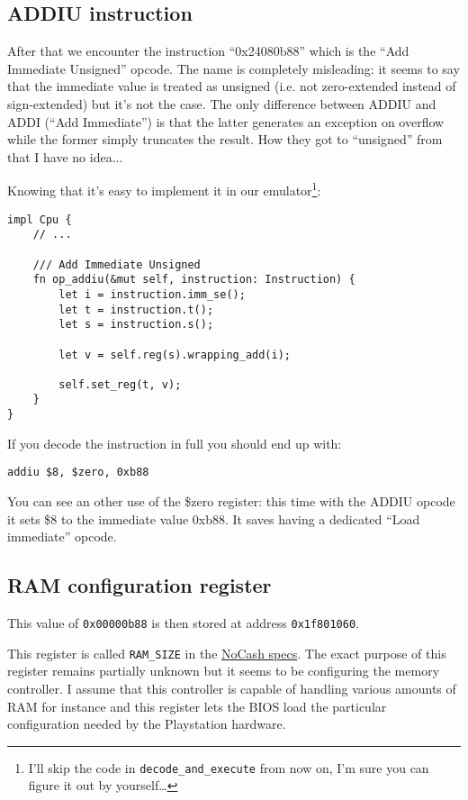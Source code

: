\documentclass[a4paper]{article}
\newcommand{\code}[1] {\texttt{#1}}
\begin{document}
\subsection{ADDIU instruction}

After that we encounter the instruction ``0x24080b88'' which is the
``Add Immediate Unsigned'' opcode. The name is completely misleading: it
seems to say that the immediate value is treated as unsigned (i.e. not
zero-extended instead of sign-extended) but it's not the case. The
only difference between ADDIU and ADDI (``Add Immediate'') is that
the latter generates an exception on overflow while the former simply
truncates the result. How they got to ``unsigned'' from that I have no
idea...

Knowing that it's easy to implement it in our emulator\footnote{I'll
  skip the code in \code{decode\_and\_execute} from now on, I'm sure
  you can figure it out by yourself\dots{}}:

\begin{lstlisting}
impl Cpu {
    // ...

    /// Add Immediate Unsigned
    fn op_addiu(&mut self, instruction: Instruction) {
        let i = instruction.imm_se();
        let t = instruction.t();
        let s = instruction.s();

        let v = self.reg(s).wrapping_add(i);

        self.set_reg(t, v);
    }
}
\end{lstlisting}

If you decode the instruction in full you should end up with:

\begin{lstlisting}[language=assembly]
addiu $8, $zero, 0xb88
\end{lstlisting}

You can see an other use of the \$zero register: this time with the
ADDIU opcode it sets \$8 to the immediate value 0xb88. It saves having
a dedicated ``Load immediate'' opcode.

\subsection{RAM configuration register}

This value of \code{0x00000b88} is then stored at address
\code{0x1f801060}.

This register is called \code{RAM\_SIZE} in the
\href{problemkaputt.de/psx-spx.htm#memorycontrol}{NoCash specs}. The
exact purpose of this register remains partially unknown but it seems
to be configuring the memory controller. I assume that this controller
is capable of handling various amounts of RAM for instance and this
register lets the BIOS load the particular configuration needed by the
Playstation hardware.
\end{document}
